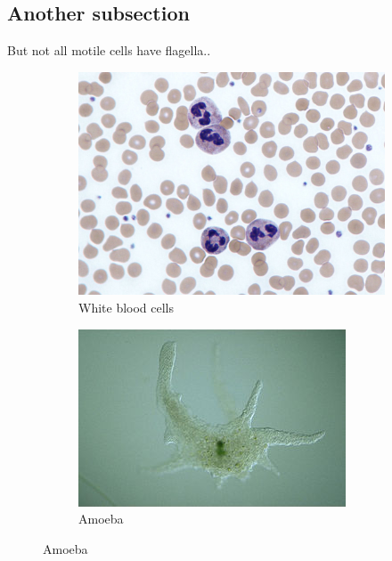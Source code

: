 \subsection{Another subsection}

\begin{frame}{\insertsubsectionhead}

  But not all motile cells have flagella..
  
  \begin{figure}
    
		\begin{subfigure}{0.4\textwidth}
			\includegraphics[width=\textwidth]{src/img/example1}
			\caption{White blood cells}
		\end{subfigure}
		\begin{subfigure}{0.44\textwidth}
			\includegraphics[width=\textwidth]{src/img/example2}
			\caption{Amoeba}
		\end{subfigure}
    
	\end{figure}

\end{frame}

